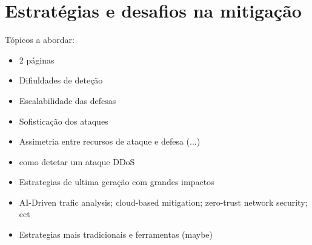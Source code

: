 \section{Estratégias e desafios na mitigação}
Tópicos a abordar:
\begin{itemize}
    \item 2 páginas
    \item Difiuldades de deteção
    \item Escalabilidade das defesas
    \item Sofisticação dos ataques
    \item Assimetria entre recursos de ataque e defesa (...)
    \item como detetar um ataque DDoS
    \item Estrategias de ultima geração com grandes impactos
    \item AI-Driven trafic analysis; cloud-based mitigation; zero-trust network security; ect
    \item Estrategias mais tradicionais e ferramentas (maybe)
\end{itemize}